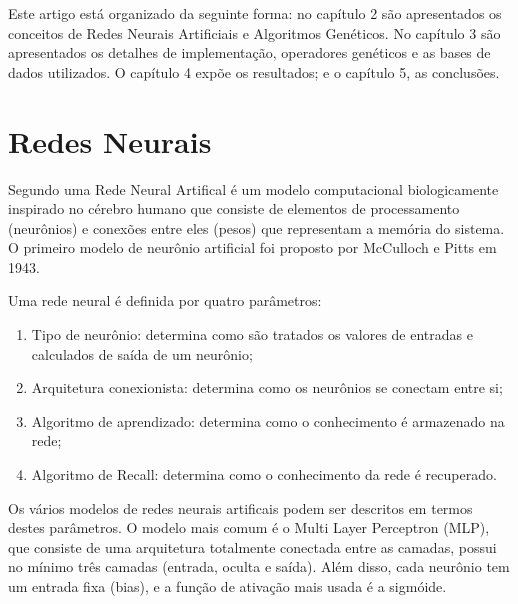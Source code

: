 \documentclass[12pt]{article}
\begin{document}
\par Este artigo está organizado da seguinte forma: no capítulo 2 são apresentados os conceitos de Redes Neurais Artificiais e Algoritmos Genéticos. No capítulo 3 são apresentados os detalhes de implementação, operadores genéticos e as bases de dados utilizados. O capítulo 4 expõe os resultados; e o capítulo 5, as conclusões.


\section{Redes Neurais}

\par Segundo \cite{kasabov} uma Rede Neural Artifical é um modelo computacional biologicamente inspirado no cérebro humano que consiste de elementos de processamento (neurônios) e conexões entre eles (pesos) que representam a memória do sistema. O primeiro modelo de neurônio artificial foi proposto por McCulloch e Pitts em 1943. 
\par Uma rede neural é definida por quatro parâmetros:

\begin{enumerate}
	\item Tipo de neurônio: determina como são tratados os valores de entradas e calculados de saída de um neurônio;
	\item Arquitetura conexionista: determina como os neurônios se conectam entre si;
	\item Algoritmo de aprendizado: determina como o conhecimento é armazenado na rede;
	\item Algoritmo de Recall: determina como o conhecimento da rede é recuperado.
\end{enumerate}

\par Os vários modelos de redes neurais artificais podem ser descritos em termos destes parâmetros. O modelo mais comum é o Multi Layer Perceptron (MLP), que consiste de uma arquitetura totalmente conectada entre as camadas, possui no mínimo três camadas (entrada, oculta e saída). Além disso, cada neurônio tem um entrada fixa (bias), e a função de ativação mais usada é a sigmóide.
\end{document}
